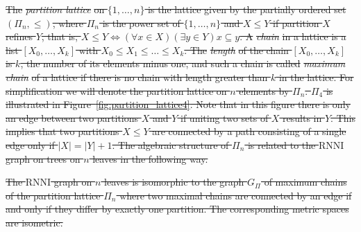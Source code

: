 \documentclass[11pt]{amsart}
\newtheorem{theorem}{Theorem}
\newcommand{\rnni}{\mathrm{RNNI}}
\providecommand{\DIFdeltex}[1]{{\protect\color{red}\sout{#1}}}                      %
\providecommand{\DIFdel}[1]{\texorpdfstring{\DIFdeltex{#1}}{}} %
\begin{document}
\DIFdel{The }\emph{\DIFdel{partition lattice}} %
\DIFdel{on $\{1, \ldots, n\}$ is the lattice given by the partially ordered set $(\Pi_n, \leq)$, where $\Pi_n$ is the power set of $\{1, \ldots, n\}$ and $X \leq Y$ if partition $X$ refines $Y$, that is, $X \leq Y \Leftrightarrow (\forall x \in X)(\exists y \in Y) x \subseteq y$.
A }\emph{\DIFdel{chain}} %
\DIFdel{in a lattice is a list $[X_0, \ldots, X_k]$ with $X_0 \leq X_1 \leq \ldots \leq X_k$.
The }\emph{\DIFdel{length}} %
\DIFdel{of the chain $[X_0, \ldots, X_k]$ is $k$, the number of its elements minus one, and such a chain is called }\emph{\DIFdel{maximum chain}} %
\DIFdel{of a lattice if there is no chain with length greater than $k$ in the lattice.
For simplification we will denote the partition lattice on $n$ elements by $\Pi_n$.
$\Pi_4$ is illustrated in Figure~\ref{fig:partition_lattice4}.
Note that in this figure there is only an edge between two partitions $X$ and $Y$ if uniting two sets of $X$ results in $Y$.
This implies that two partitions $X \leq Y$ are connected by a path consisting of a single edge only if $|X| = |Y| + 1$.
The algebraic structure of $\Pi_n$ is related to the $\rnni$ graph on trees on $n$ leaves in the following way.
}%

\DIFdel{The $\rnni$ graph on $n$ leaves is isomorphic to the graph $G_{\Pi}$ of maximum chains of the partition lattice $\Pi_n$ where two maximal chains are connected by an edge if and only if they differ by exactly one partition.
	The corresponding metric spaces are isometric.
	}%
\end{document}
